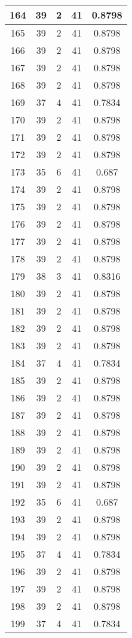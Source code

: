 \documentclass[letterpaper, 12pt]{article}
\begin{document}
\begin{longtable}{|c|c|c|c|c|}
\hline
164 & 39 & 2 & 41 & 0.8798 \\
\hline
165 & 39 & 2 & 41 & 0.8798 \\
\hline
166 & 39 & 2 & 41 & 0.8798 \\
\hline
167 & 39 & 2 & 41 & 0.8798 \\
\hline
168 & 39 & 2 & 41 & 0.8798 \\
\hline
169 & 37 & 4 & 41 & 0.7834 \\
\hline
170 & 39 & 2 & 41 & 0.8798 \\
\hline
171 & 39 & 2 & 41 & 0.8798 \\
\hline
172 & 39 & 2 & 41 & 0.8798 \\
\hline
173 & 35 & 6 & 41 & 0.687 \\
\hline
174 & 39 & 2 & 41 & 0.8798 \\
\hline
175 & 39 & 2 & 41 & 0.8798 \\
\hline
176 & 39 & 2 & 41 & 0.8798 \\
\hline
177 & 39 & 2 & 41 & 0.8798 \\
\hline
178 & 39 & 2 & 41 & 0.8798 \\
\hline
179 & 38 & 3 & 41 & 0.8316 \\
\hline
180 & 39 & 2 & 41 & 0.8798 \\
\hline
181 & 39 & 2 & 41 & 0.8798 \\
\hline
182 & 39 & 2 & 41 & 0.8798 \\
\hline
183 & 39 & 2 & 41 & 0.8798 \\
\hline
184 & 37 & 4 & 41 & 0.7834 \\
\hline
185 & 39 & 2 & 41 & 0.8798 \\
\hline
186 & 39 & 2 & 41 & 0.8798 \\
\hline
187 & 39 & 2 & 41 & 0.8798 \\
\hline
188 & 39 & 2 & 41 & 0.8798 \\
\hline
189 & 39 & 2 & 41 & 0.8798 \\
\hline
190 & 39 & 2 & 41 & 0.8798 \\
\hline
191 & 39 & 2 & 41 & 0.8798 \\
\hline
192 & 35 & 6 & 41 & 0.687 \\
\hline
193 & 39 & 2 & 41 & 0.8798 \\
\hline
194 & 39 & 2 & 41 & 0.8798 \\
\hline
195 & 37 & 4 & 41 & 0.7834 \\
\hline
196 & 39 & 2 & 41 & 0.8798 \\
\hline
197 & 39 & 2 & 41 & 0.8798 \\
\hline
198 & 39 & 2 & 41 & 0.8798 \\
\hline
199 & 37 & 4 & 41 & 0.7834 \\
\hline
\end{longtable}
\end{document}
